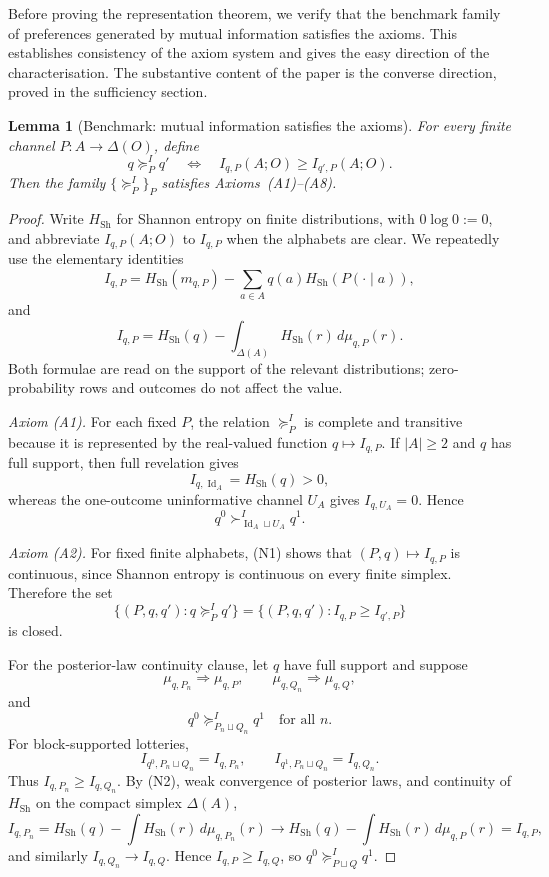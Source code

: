 \documentclass[11pt,a4paper]{article}
\newtheorem{lemma}[theorem]{Lemma}
\theoremstyle{definition}
\newcommand{\Id}{\operatorname{Id}}
\newcommand{\Sh}{H_{\mathrm{Sh}}}
\newcommand{\1}{\mathbf 1}
\begin{document}
Before proving the representation theorem, we verify that the benchmark family of preferences generated by mutual
information satisfies the axioms.  This establishes consistency of the axiom system and gives the easy direction of the
characterisation.  The substantive content of the paper is the converse direction, proved in the sufficiency section.

\begin{lemma}[Benchmark: mutual information satisfies the axioms]\label{lem:MIbenchmark}
For every finite channel $P:A\to\Delta(O)$, define
\[
q\succeq^I_P q'
\quad\Longleftrightarrow\quad
I_{q,P}(A;O)\ge I_{q',P}(A;O).
\]
Then the family $\{\succeq^I_P\}_P$ satisfies Axioms~\textup{(A1)--(A8)}.
\end{lemma}

\begin{proof}
Write $\Sh$ for Shannon entropy on finite distributions, with $0\log0:=0$, and abbreviate $I_{q,P}(A;O)$ to
$I_{q,P}$ when the alphabets are clear.  We repeatedly use the elementary identities
\[
I_{q,P}
=
\Sh(m_{q,P})-\sum_{a\in A}q(a)\Sh(P(\cdot\mid a)),
\tag{N1}
\]
and
\[
I_{q,P}
=
\Sh(q)-\int_{\Delta(A)}\Sh(r)\,d\mu_{q,P}(r).
\tag{N2}
\]
Both formulae are read on the support of the relevant distributions; zero-probability rows and outcomes do not affect the
value.

\emph{Axiom \textup{(A1)}.}
For each fixed $P$, the relation $\succeq^I_P$ is complete and transitive because it is represented by the real-valued
function $q\mapsto I_{q,P}$.  If $|A|\ge2$ and $q$ has full support, then full revelation gives
\[
I_{q,\Id_A}=\Sh(q)>0,
\]
whereas the one-outcome uninformative channel $U_A$ gives $I_{q,U_A}=0$.  Hence
\[
q^0\succ^I_{\Id_A\sqcup U_A}q^1.
\]

\emph{Axiom \textup{(A2)}.}
For fixed finite alphabets, (N1) shows that $(P,q)\mapsto I_{q,P}$ is continuous, since Shannon entropy is continuous on
every finite simplex.  Therefore the set
\[
\{(P,q,q'):q\succeq^I_P q'\}
=
\{(P,q,q'):I_{q,P}\ge I_{q',P}\}
\]
is closed.

For the posterior-law continuity clause, let $q$ have full support and suppose
\[
\mu_{q,P_n}\Rightarrow\mu_{q,P},
\qquad
\mu_{q,Q_n}\Rightarrow\mu_{q,Q},
\]
and
\[
q^0\succeq^I_{P_n\sqcup Q_n}q^1
\quad\text{for all }n.
\]
For block-supported lotteries,
\[
I_{q^0,P_n\sqcup Q_n}=I_{q,P_n},
\qquad
I_{q^1,P_n\sqcup Q_n}=I_{q,Q_n}.
\]
Thus $I_{q,P_n}\ge I_{q,Q_n}$.  By (N2), weak convergence of posterior laws, and continuity of $\Sh$ on the compact
simplex $\Delta(A)$,
\[
I_{q,P_n}
=
\Sh(q)-\int\Sh(r)\,d\mu_{q,P_n}(r)
\longrightarrow
\Sh(q)-\int\Sh(r)\,d\mu_{q,P}(r)
=
I_{q,P},
\]
and similarly $I_{q,Q_n}\to I_{q,Q}$.  Hence $I_{q,P}\ge I_{q,Q}$, so
$q^0\succeq^I_{P\sqcup Q}q^1$.


\end{proof}
\end{document}

